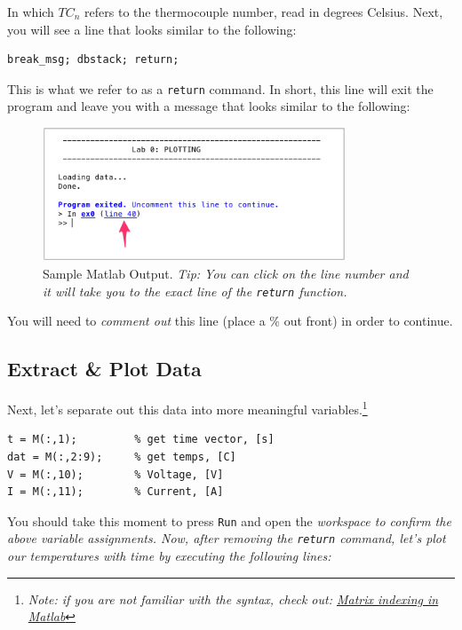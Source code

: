 \documentclass[11pt, letterpaper]{article}
\begin{document}
In which $TC_n$ refers to the thermocouple number, read in degrees Celsius. Next, you will see a line that looks similar to the following:
\n
\begin{lstlisting}[numbers=none]
% COMMENT ME OUT!!
break_msg; dbstack; return;
\end{lstlisting}

\n
This is what we refer to as a \texttt{return} command. In short, this line will exit the program and leave you with a message that looks similar to the following:
\begin{figure}[H]
    \begin{center}
        \includegraphics[width=90mm]{gfx/program_exit_line.png}
    \caption{Sample Matlab Output. \textit{Tip: You can click on the line number and it will take you to the exact line of the \texttt{return} function.}}
    \end{center}
\end{figure}
\vspace{-2mm}
You will need to \textit{comment out} this line (place a \% out front) in order to continue.

\subsection{Extract \& Plot Data}
Next, let's separate out this data into more meaningful variables.\footnote{\textit{Note: if you are not familiar with the syntax, check out: \href{https://www.mathworks.com/company/newsletters/articles/matrix-indexing-in-matlab.html}{Matrix indexing in Matlab}  }} 
\n
\begin{lstlisting}[numbers=none]
t = M(:,1);         % get time vector, [s]
dat = M(:,2:9);     % get temps, [C]
V = M(:,10);        % Voltage, [V]
I = M(:,11);        % Current, [A]
\end{lstlisting}

\n
You should take this moment to press \texttt{Run} and open the \it{workspace} to confirm the above variable assignments. Now, after removing the \texttt{return} command, let's plot our temperatures with time by executing the following lines:
\end{document}
